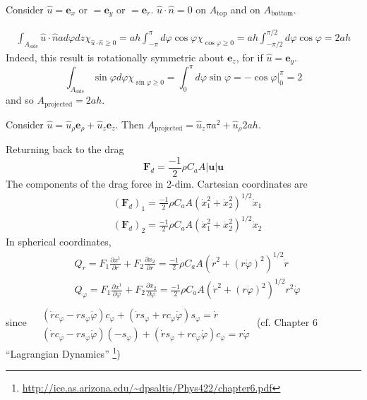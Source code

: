 \documentclass[10pt]{amsart}
\begin{document}
\begin{multicols*}{2}
Consider $\widehat{u} = \mathbf{e}_x$ or $= \mathbf{e}_y$ or $= \mathbf{e}_r$.  $\widehat{u}\cdot \widehat{n} =0$ on $A_{\text{top}}$ and on $A_{\text{bottom}}$.  

\[
\begin{gathered}
  \int_{A_{\text{side}}} \widehat{u}\cdot \widehat{n} a d\varphi dz \chi_{\widehat{u}\cdot \widehat{n} \geq 0 } = ah \int_{-\pi}^{\pi} d\varphi \cos{\varphi} \chi_{\cos{\varphi} \geq 0} = ah \int_{-\pi/2}^{\pi/2} d\varphi \cos{\varphi} = 2ah
\end{gathered}
\]
Indeed, this result is rotationally symmetric about $\mathbf{e}_z$, for if $\widehat{u} = \mathbf{e}_y$.
\[
\int_{A_{\text{side}}} \sin{\varphi} d\varphi \chi_{\sin{ \varphi} \geq 0 } = \int_0^{\pi} d\varphi \sin{\varphi } = \left. - \cos{\varphi} \right|_0^{\pi} = 2 
\]
and so $A_{\text{projected}} = 2ah$.  

Consider $\widehat{u} = \widehat{u}_{\rho} \mathbf{e}_{\rho} + \widehat{u}_z \mathbf{e}_z$.  Then $A_{\text{projected}} = \widehat{u}_z \pi a^2 + \widehat{u}_{\rho} 2ah$.  

Returning back to the drag
\[
\mathbf{F}_d = \frac{-1}{2} \rho C_a A | \mathbf{u} | \mathbf{u}
\]
The components of the drag force in 2-dim. Cartesian coordinates are
\[
\begin{aligned}
  & (\mathbf{F}_d)_1 = \frac{-1}{2} \rho C_a A(\dot{x}_1^2 + \dot{x}_2^2)^{1/2} \dot{x}_1 \\ 
  & (\mathbf{F}_d)_2 = \frac{-1}{2} \rho C_a A(\dot{x}_1^2 + \dot{x}_2^2)^{1/2} \dot{x}_2 
\end{aligned}
\]
In spherical coordinates, 
\[
\begin{aligned}
  & Q_r = F_1 \frac{ \partial x^1}{ \partial r} + F_2 \frac{ \partial x_2 }{ \partial r } = \frac{-1}{2} \rho C_a A (\dot{r}^2 + (r\dot{\varphi})^2)^{1/2} \dot{r} \\ 
  & Q_{\varphi} = F_1 \frac{ \partial x^1}{ \partial \varphi} + F_2 \frac{ \partial x_2 }{ \partial \varphi } = \frac{-1}{2} \rho C_a A (\dot{r}^2 + (r\dot{\varphi})^2)^{1/2} r^2 \dot{\varphi}
\end{aligned}
\]
since $\begin{aligned} & \quad \\
  & (\dot{r} c_{\varphi} - rs_{\varphi} \dot{\varphi} )c_{\varphi} + (\dot{r} s_{\varphi} + rc_{\varphi} \dot{\varphi} )s_{\varphi} = \dot{r} \\ 
  & (\dot{r} c_{\varphi} - rs_{\varphi} \dot{\varphi} )(-s_{\varphi}) + (\dot{r} s_{\varphi} + rc_{\varphi} \dot{\varphi} )c_{\varphi} = r \dot{\varphi}
\end{aligned}$ (cf. Chapter 6 ``Lagrangian Dynamics'' \footnote{\url{http://ice.as.arizona.edu/~dpsaltis/Phys422/chapter6.pdf}})




\end{multicols*}
\end{document}
